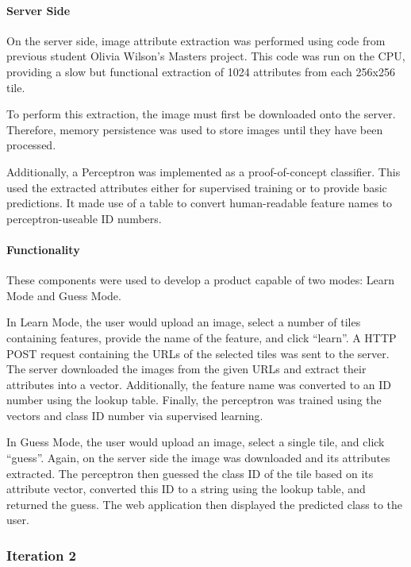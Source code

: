 \paragraph{Server Side\\}
On the server side, image attribute extraction was performed using code from previous student Olivia Wilson’s Masters project. This code was run on the CPU, providing a slow but functional extraction of 1024 attributes from each 256x256 tile.

To perform this extraction, the image must first be downloaded onto the server. Therefore, memory persistence was used to store images until they have been processed.

Additionally, a Perceptron was implemented as a proof-of-concept classifier. This used the extracted attributes either for supervised training or to provide basic predictions. It made use of a table to convert human-readable feature names to perceptron-useable ID numbers. 
\paragraph{Functionality\\}
These components were used to develop a product capable of two modes: Learn Mode and Guess Mode.

In Learn Mode, the user would upload an image, select a number of tiles containing features, provide the name of the feature, and click ``learn”. A HTTP POST request containing the URLs of the selected tiles was sent to the server. The server downloaded the images from the given URLs and extract their attributes into a vector. Additionally, the feature name was converted to an ID number using the lookup table. Finally, the perceptron was trained using the vectors and class ID number via supervised learning.

In Guess Mode, the user would upload an image, select a single tile, and click ``guess”. Again, on the server side the image was downloaded and its attributes extracted. The perceptron then guessed the class ID of the tile based on its attribute vector, converted this ID to a string using the lookup table, and returned the guess. The web application then displayed the predicted class to the user.

\subsubsection{Iteration 2}
